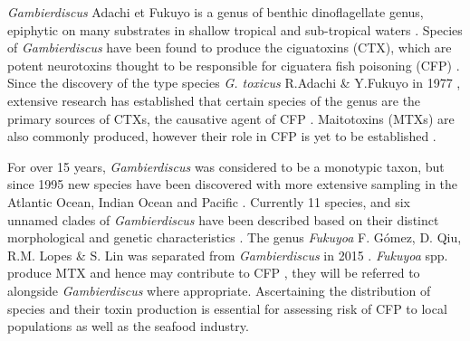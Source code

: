 \documentclass[12pt]{article}
\begin{document}
\emph{Gambierdiscus} Adachi et Fukuyo is a genus of benthic dinoflagellate genus, epiphytic on many substrates in shallow tropical and sub-tropical waters \citep{marine2014}. 
Species of \emph{Gambierdiscus} have been found to produce the ciguatoxins (CTX), which are potent neurotoxins thought to be responsible for ciguatera fish poisoning (CFP) \citep{berdalet2012global}. 
Since the discovery of the type species \emph{G. toxicus} R.Adachi \& Y.Fukuyo in 1977 \citep{yasumoto1977finding}, extensive research has established that certain species of the genus are the primary sources of CTXs, the causative agent of CFP \citep{chinain1997intraspecific,holmes1998gambierdiscus}. 
Maitotoxins (MTXs) are also commonly produced, however their role in CFP is yet to be established \citep{kohli2014feeding}. 

For over 15 years, \emph{Gambierdiscus} was considered to be a monotypic taxon, but since 1995 new species have been discovered with more extensive sampling in the Atlantic Ocean, Indian Ocean and Pacific \citep{faust1995observation,holmes1998gambierdiscus,litaker2009taxonomy,chinain1999morphology,fraga2011gambierdiscus,nishimura2014morphology}.
Currently 11 species, and six unnamed clades of \emph{Gambierdiscus} have been described based on their distinct morphological and genetic characteristics \citep{adachi1979thecal,faust1995observation,chinain1999morphology,litaker2009taxonomy,nishimura2014morphology,fraga2011gambierdiscus}.  
The genus \emph{Fukuyoa} F. G\'omez, D. Qiu, R.M. Lopes \& S. Lin was separated from \emph{Gambierdiscus} in 2015 \citep{gomez2015fukuyoa}. \emph{Fukuyoa} spp. produce MTX \citep{holmes1998gambierdiscus,holland2013differences} and hence may contribute to CFP \citep{kohli2014feeding}, they will be referred to alongside \emph{Gambierdiscus} where appropriate.
Ascertaining the distribution of species and their toxin production is essential for assessing risk of CFP to local populations as well as the seafood industry.
\end{document}
